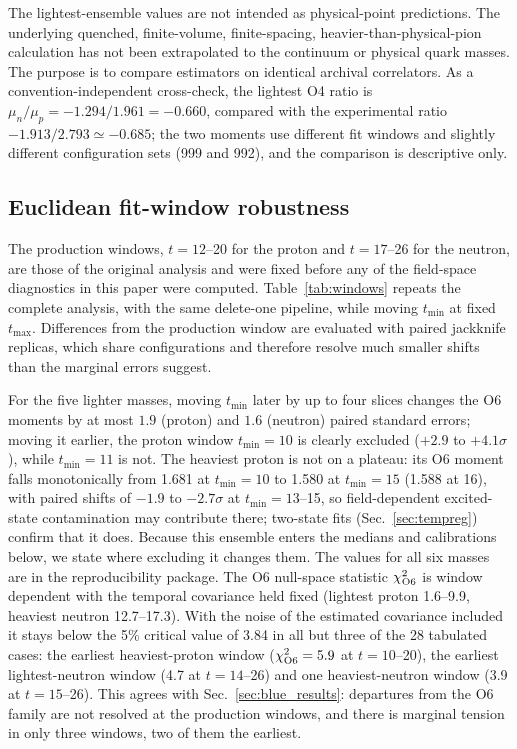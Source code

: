 \documentclass[aps,prd,reprint,twocolumn,superscriptaddress,nofootinbib,longbibliography]{revtex4-2}
\begin{document}
The lightest-ensemble values are not intended as physical-point predictions. The underlying quenched, finite-volume, finite-spacing, heavier-than-physical-pion calculation has not been extrapolated to the continuum or physical quark masses. The purpose is to compare estimators on identical archival correlators. As a convention-independent cross-check, the lightest O4 ratio is $\mu_n/\mu_p=-1.294/1.961=-0.660$, compared with the experimental ratio $-1.913/2.793\simeq-0.685$; the two moments use different fit windows and slightly different configuration sets (999 and 992), and the comparison is descriptive only.


\subsection{Euclidean fit-window robustness}
\label{sec:windows}

The production windows, $t=12$--20 for the proton and $t=17$--26 for the neutron, are those of the original analysis and were fixed before any of the field-space diagnostics in this paper were computed. Table~\ref{tab:windows} repeats the complete analysis, with the same delete-one pipeline, while moving $t_{\min}$ at fixed $t_{\max}$. Differences from the production window are evaluated with paired jackknife replicas, which share configurations and therefore resolve much smaller shifts than the marginal errors suggest.

For the five lighter masses, moving $t_{\min}$ later by up to four slices changes the O6 moments by at most $1.9$ (proton) and $1.6$ (neutron) paired standard errors; moving it earlier, the proton window $t_{\min}=10$ is clearly excluded ($+2.9$ to $+4.1\sigma$), while $t_{\min}=11$ is not. The heaviest proton is not on a plateau: its O6 moment falls monotonically from 1.681 at $t_{\min}=10$ to 1.580 at $t_{\min}=15$ (1.588 at 16), with paired shifts of $-1.9$ to $-2.7\sigma$ at $t_{\min}=13$--15, so field-dependent excited-state contamination may contribute there; two-state fits (Sec.~\ref{sec:tempreg}) confirm that it does. Because this ensemble enters the medians and calibrations below, we state where excluding it changes them. The values for all six masses are in the reproducibility package. The O6 null-space statistic $\chi^2_{\rm O6}$ is window dependent with the temporal covariance held fixed (lightest proton 1.6--9.9, heaviest neutron 12.7--17.3). With the noise of the estimated covariance included it stays below the 5\% critical value of 3.84 in all but three of the 28 tabulated cases: the earliest heaviest-proton window ($\chi^2_{\rm O6}=5.9$ at $t=10$--20), the earliest lightest-neutron window (4.7 at $t=14$--26) and one heaviest-neutron window (3.9 at $t=15$--26). This agrees with Sec.~\ref{sec:blue_results}: departures from the O6 family are not resolved at the production windows, and there is marginal tension in only three windows, two of them the earliest.
\end{document}
